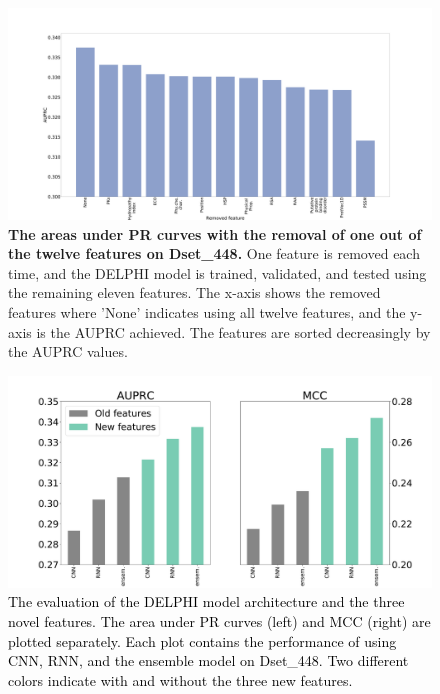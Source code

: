 \documentclass{bioinfo}
\newcommand{\myColor}{black}
\begin{document}
\begin{figure}
\centering
\includegraphics[width=\columnwidth]{remove_features_individually_Testing.pdf}
  \caption{\textbf{The areas under PR curves with the removal of one out of the twelve features on Dset\_448.} One feature is removed each time, and the DELPHI model is trained, validated, and tested using the remaining eleven features. The x-axis shows the removed features where 'None' indicates using all twelve features, and the y-axis is the AUPRC achieved. The features are sorted decreasingly by the AUPRC values. 
  \label{fig_remove_each_feature}}
\end{figure}

\begin{figure}
\centering
\includegraphics[width=\columnwidth]{CNN_RNN_ensemble.pdf}
  \caption{\textcolor{\myColor}{{The evaluation of the DELPHI model architecture and the three novel features.} The area under PR curves (left) and MCC (right) are plotted separately. Each plot contains the performance of using CNN, RNN, and the ensemble model on Dset\_448. Two different colors indicate with and without the three new features.}
  \label{fig_CNN_RNN_ensemble}}
\end{figure}
\end{document}
